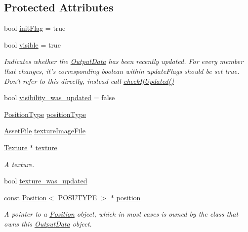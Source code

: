 \subsection*{Protected Attributes}
\begin{DoxyCompactItemize}
\item 
bool \hyperlink{struct_output_data_a4b90649aee88b935b5ebf38dee4aff7b}{init\-Flag} = true
\item 
bool \hyperlink{struct_output_data_ab1d5abc732db0f826a01afbea44ada34}{visible} = true
\begin{DoxyCompactList}\small\item\em Indicates whether the \hyperlink{struct_output_data}{Output\-Data} has been recently updated. For every member that changes, it's corresponding boolean within update\-Flags should be set true. Don't refer to this directly, instead call \hyperlink{struct_output_data_a2b19b9cd0df099c3f923f9c5f1ef28d9}{check\-If\-Updated()} \end{DoxyCompactList}\item 
bool \hyperlink{struct_output_data_a0f15b2dc64531dfd8dd0925840c4758e}{visibility\-\_\-was\-\_\-updated} = false
\item 
\hyperlink{_output_data_8hpp_aa80fe4e9a559009407475c9587214b48}{Position\-Type} \hyperlink{struct_output_data_a344be69157cfd43c9ace4158b0e58b6b}{position\-Type}
\item 
\hyperlink{struct_asset_file}{Asset\-File} \hyperlink{struct_output_data_aada926eef9e2b2b654caa32de712ef1b}{texture\-Image\-File}
\item 
\hyperlink{_default_config_8h_a9ca20d8445e7d830c262f5ec4bb5d1bf}{Texture} $\ast$ \hyperlink{struct_output_data_af592125b9117db60d387049a7631c763}{texture}
\begin{DoxyCompactList}\small\item\em A texture. \end{DoxyCompactList}\item 
bool \hyperlink{struct_output_data_aa35a2457b23d1a6843ec49c2f6a4b29a}{texture\-\_\-was\-\_\-updated}
\item 
const \hyperlink{struct_position}{Position}$<$ P\-O\-S\-U\-T\-Y\-P\-E $>$ $\ast$ \hyperlink{struct_output_data_a7494156691e440a9a6f2c808321b0cd5}{position}
\begin{DoxyCompactList}\small\item\em A pointer to a \hyperlink{struct_position}{Position} object, which in most cases is owned by the class that owns this \hyperlink{struct_output_data}{Output\-Data} object. \end{DoxyCompactList}\item 

\end{DoxyCompactItemize}

